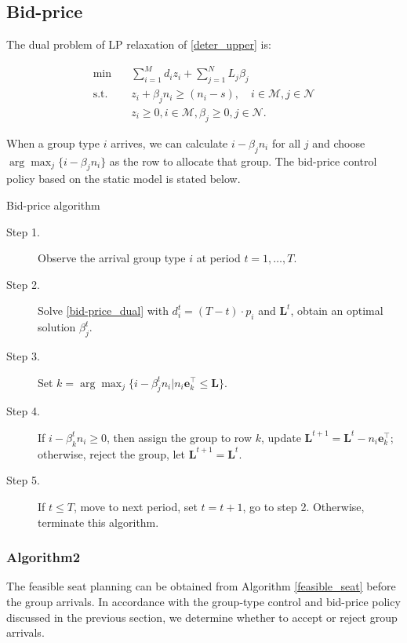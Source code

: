 \subsection{Bid-price}

The dual problem of LP relaxation of \eqref{deter_upper} is:

\begin{equation}\label{bid-price_dual}
  \begin{aligned}
  \min \quad & \sum_{i=1}^{M} d_i z_i + \sum_{j= 1}^{N} L_j \beta_{j} \\
  \text {s.t.} \quad & z_{i} + \beta_j n_i \geq (n_i-s), \quad i \in \mathcal{M}, j \in \mathcal{N} \\
  & z_{i} \geq 0, i \in \mathcal{M}, \beta_{j} \geq 0, j \in \mathcal{N}.
  \end{aligned}
\end{equation}

When a group type $i$ arrives, we can calculate $i -\beta_{j} n_i$ for all $j$ and choose $\arg \max_{j} \{i -\beta_{j} n_i\}$ as the row to allocate that group. The bid-price control policy based on the static model is stated below.

\begin{algorithm}[H]
  \caption{Bid-price algorithm}
  \begin{description}
    \item[Step 1.] Observe the arrival group type $i$ at period $t = 1, \ldots, T$.
    \item[Step 2.] Solve \eqref{bid-price_dual} with $d_i^{t} = (T-t) \cdot p_i$ and $\mathbf{L}^{t}$, obtain an optimal solution $\beta_{j}^{t}$.
    \item[Step 3.] Set $k = \arg \max_{j} \{i -\beta_{j}^{t} n_i | n_i \mathbf{e}_{k}^{\top} \leq \mathbf{L}\}$.
    \item[Step 4.] If $i -\beta_{k}^{t} n_i \geq 0$, then assign the group to row $k$, update $\mathbf{L}^{t+1} = \mathbf{L}^{t} - n_i \mathbf{e}_{k}^{\top}$; otherwise, reject the group, let $\mathbf{L}^{t+1} = \mathbf{L}^{t}$. 
    \item[Step 5.] If $t \leq T$, move to next period, set $t = t+1$, go to step 2. Otherwise, terminate this algorithm.
  \end{description}
\end{algorithm}

\subsubsection{Algorithm2}
The feasible seat planning can be obtained from Algorithm \ref{feasible_seat} before the group arrivals. In accordance with the group-type control and bid-price policy discussed in the previous section, we determine whether to accept or reject group arrivals.

